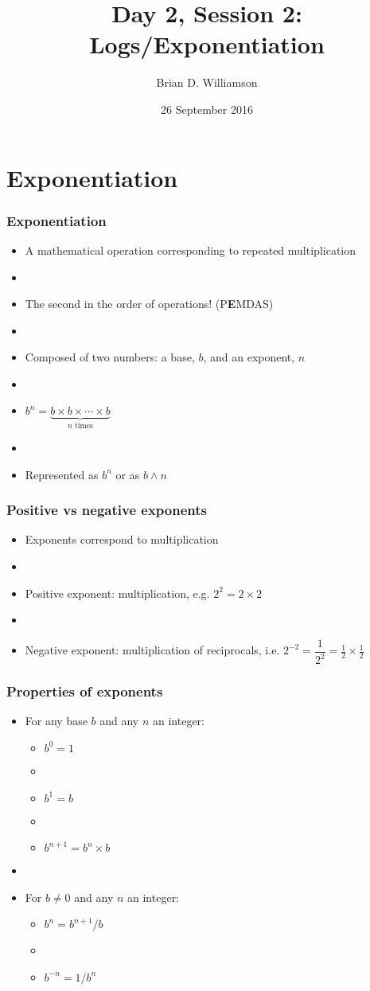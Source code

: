 \documentclass[12pt]{beamer}
\title{Day 2, Session 2: Logs/Exponentiation}
\author{Brian D. Williamson}
\institute{EPI/BIOST Bootcamp 2016}
\date{26 September 2016}
\newcommand{\myframe}[1]{\begin{frame} \frametitle{#1}}
\begin{document}
\begin{frame}
\titlepage
\end{frame}

\section{Exponentiation}
\myframe{Exponentiation}
\begin{itemize}
\item A mathematical operation corresponding to repeated multiplication
\item[]
\item The second in the order of operations! (P{\textbf E}MDAS)
\item[]
\item Composed of two numbers: a base, $b$, and an exponent, $n$
\item[]
\item $b^n = \underbrace{b\times b \times \cdots \times b}_\text{$n$ times}$
\item[]
\item Represented as $b^n$ or as $b \wedge n$
\end{itemize}
\end{frame}

\myframe{Positive vs negative exponents}
\begin{itemize}
\item Exponents correspond to multiplication
\item[]
\item Positive exponent: multiplication, e.g. $2^2 = 2\times 2$
\item[]
\item Negative exponent: multiplication of reciprocals, i.e. $2^{-2} = \dfrac{1}{2^2} = \frac{1}{2}\times \frac{1}{2}$
\end{itemize}
\end{frame}

\myframe{Properties of exponents}
\begin{itemize}
\item For any base $b$ and any $n$ an integer:
\begin{itemize}
\item $b^0 = 1$
\item[]
\item $b^1 = b$
\item[]
\item $b^{n+1} = b^n \times b$
\end{itemize}
\item[]
\item For $b \neq 0$ and any $n$ an integer:
\begin{itemize}
\item $b^n = b^{n+1}/b$
\item[]
\item $b^{-n} = 1/b^n$
\end{itemize}
\end{itemize}
\end{frame}
\end{document}
